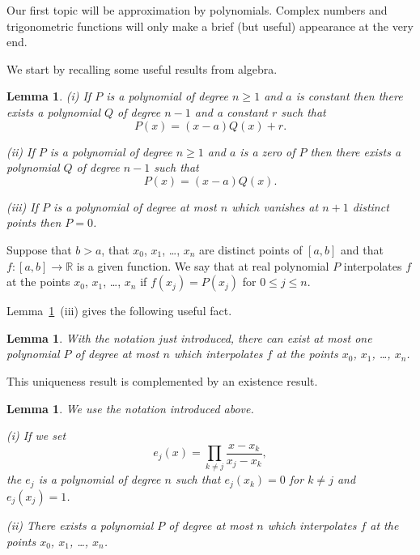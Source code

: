 \documentclass[12pt]{article}
\newtheorem{lemma}[theorem]{Lemma}
\theoremstyle{definition}
\begin{document}
Our first topic will be approximation by polynomials.
Complex numbers and trigonometric functions will only make
a brief (but useful) appearance at the very end.

We start by recalling some useful results from algebra.
\begin{lemma}\label{L, Division algorithm}
(i) If $P$ is a polynomial of degree $n\geq 1$
and $a$ is constant then there exists a polynomial $Q$
of degree $n-1$ and a constant $r$ such that
\[P(x)=(x-a)Q(x)+r.\]

(ii) If $P$ is a polynomial of degree $n\geq 1$
and $a$ is a zero of $P$ then there exists a polynomial $Q$
of degree $n-1$ such that
\[P(x)=(x-a)Q(x).\]

(iii) If $P$ is a polynomial of degree at most $n$ which
vanishes at $n+1$ distinct points then $P=0$.
\end{lemma}

Suppose that $b>a$, that $x_{0}$, $x_{1}$, \dots, $x_{n}$
are distinct points of $[a,b]$ and that 
$f:[a,b]\rightarrow{\mathbb R}$ is a given function.
We say that at real polynomial $P$ interpolates $f$
at the points $x_{0}$, $x_{1}$, \dots, $x_{n}$
if $f(x_{j})=P(x_{j})$ for $0\leq j\leq n$.

Lemma~\ref{L, Division algorithm}~(iii) gives the following useful fact.
\begin{lemma}\label{L, interpolation unique} 
With the notation just introduced, there can exist
at most one polynomial $P$ of degree at most $n$ which
interpolates $f$ at the points $x_{0}$, $x_{1}$, \dots, $x_{n}$.
\end{lemma}
This uniqueness result is complemented by an existence
result.
\begin{lemma} We use the notation introduced above.

(i) If we set
\[e_{j}(x)=\prod_{k\neq j}\frac{x-x_{k}}{x_{j}-x_{k}},\]
the $e_{j}$ is a polynomial of degree $n$ such that
$e_{j}(x_{k})=0$ for $k\neq j$ and $e_{j}(x_{j})=1$.

(ii) There exists a polynomial $P$ of degree at most $n$ which
interpolates $f$ at the points $x_{0}$, $x_{1}$, \dots, $x_{n}$.
\end{lemma}
\end{document}
